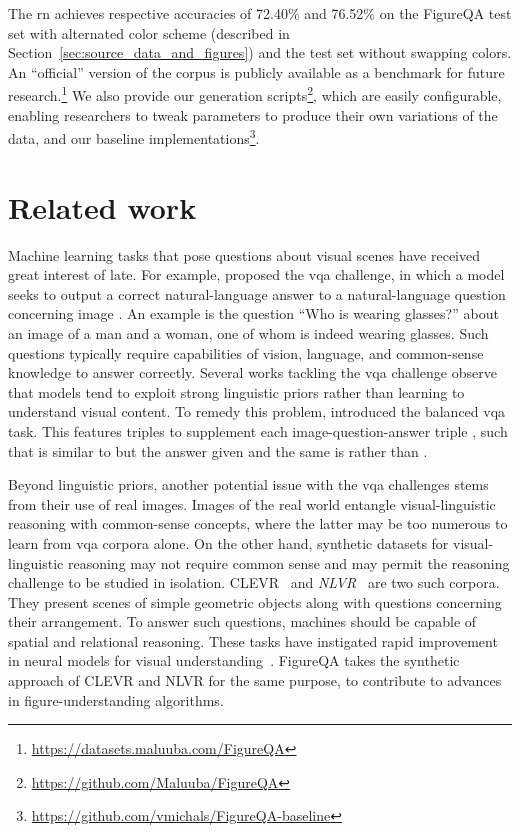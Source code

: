 \documentclass{article} \usepackage{iclr2018_workshop,times}
\def\bestrntestone{76.52} \def\bestrntesttwo{72.40} \def\bestcnntesttwo{56.00} \def\bestvggtesttwo{52.47} \def\besttexttesttwo{50.01} \def\besthumantesttwohuman{91.21} \def\bestcnntesttwohuman{56.04} \def\bestrntesttwohuman{72.18} \def\bestrnonevalone{67.95} \def\bestrnonevaltwo{60.60} \def\bestrnonetestone{67.74} \def\bestrnonetesttwo{60.35}
\begin{document}
The \gls{rn} achieves respective accuracies of \bestrntesttwo\% and \bestrntestone\% on the FigureQA test set with alternated color scheme (described in Section~\ref{sec:source_data_and_figures}) and the test set without swapping colors.
An ``official'' version of the corpus is publicly available as a benchmark for future research.\footnote{\url{https://datasets.maluuba.com/FigureQA}} 
We also provide our generation scripts\footnote{\url{https://github.com/Maluuba/FigureQA}}, which are easily configurable, enabling researchers to tweak parameters to produce their own variations of the data, and our baseline implementations\footnote{\url{https://github.com/vmichals/FigureQA-baseline}}.

\section{Related work}
\label{sec:related}
Machine learning tasks that pose questions about visual scenes have received great interest of late.
For example, \citet{antol2015vqa} proposed the \gls{vqa} challenge, in which a model seeks to output a correct natural-language answer  to a natural-language question  concerning image .
An example is the question ``Who is wearing glasses?'' about an image of a man and a woman, one of whom is indeed wearing glasses.
Such questions typically require capabilities of vision, language, and common-sense knowledge to answer correctly.
Several works tackling the \gls{vqa} challenge observe
that models tend to exploit strong linguistic priors rather than learning
to understand visual content. To remedy this problem, \citet{goyal2016making} 
introduced the balanced \gls{vqa} task. This features
triples   to supplement each image-question-answer triple , 
such that  is similar to  but the answer given  and the 
same  is  rather than .

Beyond linguistic priors, another potential issue with the \gls{vqa} challenges stems from their use of real images.
Images of the real world entangle visual-linguistic reasoning with common-sense concepts,
where the latter may be too numerous to learn from \gls{vqa} corpora alone.
On the other hand, synthetic datasets for visual-linguistic reasoning may not require common sense and may permit the reasoning challenge to be studied in isolation.
CLEVR~\citep{johnson2016clevr} and \emph{NLVR}~\citep{suhr2017corpus} are two such corpora.
They present scenes of simple geometric objects along with questions concerning their arrangement. To answer such questions, machines should be capable of spatial and relational reasoning.
These tasks have instigated rapid improvement in neural models for visual understanding~\citep{santoro2017simple,perez2017learning,hu2017learning}.
FigureQA takes the synthetic approach of CLEVR and NLVR for the same purpose, to contribute to advances in figure-understanding algorithms.
\end{document}
